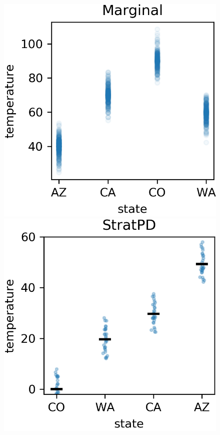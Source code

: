 \documentclass[12pt]{article}
\begin{document}
\begin{figure}[htbp]
\begin{center}
\includegraphics[scale=0.7]{images/state_vs_temp.png}
\includegraphics[scale=0.7]{images/state_vs_temp_stratpd.png}

\end{center}
\end{figure}
\end{document}
